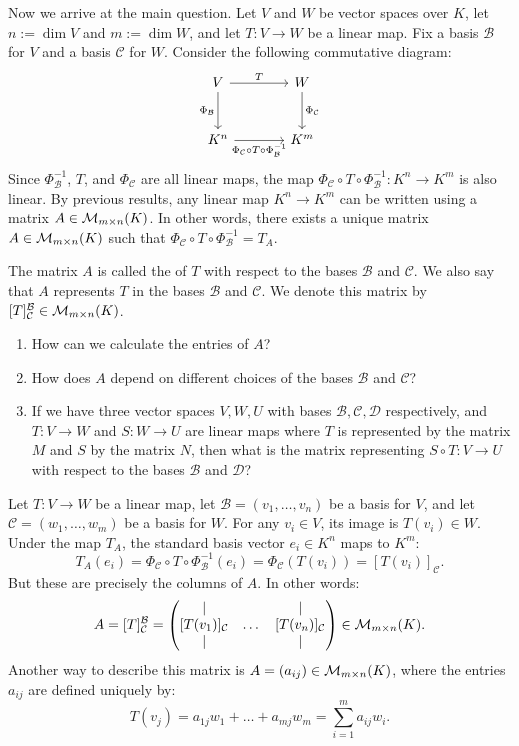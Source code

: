 Now we arrive at the main question. Let $V$ and $W$ be vector spaces over $K$, let $n := \dim V$ and $m := \dim W$, and let $T: V \to W$ be a linear map. Fix a basis $\mathcal{B}$ for $V$ and a basis $\mathcal{C}$ for $W$. Consider the following commutative diagram:
\[
\begin{tikzcd}[row sep=large, column sep=large]
V \arrow[r, "T"] \arrow[d, "\Phi_{\mathcal{B}}"'] & W \arrow[d, "\Phi_{\mathcal{C}}"] \\
K^n \arrow[r, "\Phi_{\mathcal{C}} \circ T \circ \Phi_{\mathcal{B}}^{-1}"'] & K^m
\end{tikzcd}
\]
Since $\Phi_{\mathcal{B}}^{-1}$, $T$, and $\Phi_{\mathcal{C}}$ are all linear maps, the map $\Phi_{\mathcal{C}} \circ T \circ \Phi_{\mathcal{B}}^{-1}: K^n \to K^m$ is also linear. By previous results, any linear map $K^n \to K^m$ can be written using a matrix $A \in \mathcal{M}_{m \times n}(K)$. In other words, there exists a unique matrix $A \in \mathcal{M}_{m \times n}(K)$ such that $\Phi_{\mathcal{C}} \circ T \circ \Phi_{\mathcal{B}}^{-1} = T_A$.

The matrix $A$ is called the  of $T$ with respect to the bases $\mathcal{B}$ and $\mathcal{C}$. We also say that $A$ represents $T$ in the bases $\mathcal{B}$ and $\mathcal{C}$. We denote this matrix by $[T]_{\mathcal{C}}^{\mathcal{B}} \in \mathcal{M}_{m \times n}(K)$.

\begin{question}
\begin{enumerate}
    \item How can we calculate the entries of $A$?
    \item How does $A$ depend on different choices of the bases $\mathcal{B}$ and $\mathcal{C}$?
    \item If we have three vector spaces $V, W, U$ with bases $\mathcal{B}, \mathcal{C}, \mathcal{D}$ respectively, and $T: V \to W$ and $S: W \to U$ are linear maps where $T$ is represented by the matrix $M$ and $S$ by the matrix $N$, then what is the matrix representing $S \circ T: V \to U$ with respect to the bases $\mathcal{B}$ and $\mathcal{D}$?
\end{enumerate}
\end{question}

Let $T: V \to W$ be a linear map, let $\mathcal{B} = (v_1, \dots, v_n)$ be a basis for $V$, and let $\mathcal{C} = (w_1, \dots, w_m)$ be a basis for $W$. For any $v_i \in V$, its image is $T(v_i) \in W$. Under the map $T_A$, the standard basis vector $e_i \in K^n$ maps to $K^m$:
\[
T_A(e_i) = \Phi_{\mathcal{C}} \circ T \circ \Phi_{\mathcal{B}}^{-1}(e_i) = \Phi_{\mathcal{C}}(T(v_i)) = [T(v_i)]_{\mathcal{C}}.
\]
But these are precisely the columns of $A$. In other words:
\[
A = [T]_{\mathcal{C}}^{\mathcal{B}} = 
\begin{pmatrix}
| & & | \\
[T(v_1)]_{\mathcal{C}} & \dots & [T(v_n)]_{\mathcal{C}} \\
| & & |
\end{pmatrix}
\in \mathcal{M}_{m \times n}(K).
\]
Another way to describe this matrix is $A = (a_{ij}) \in \mathcal{M}_{m \times n}(K)$, where the entries $a_{ij}$ are defined uniquely by:
\[
T(v_j) = a_{1j} w_1 + \dots + a_{mj} w_m = \sum_{i=1}^m a_{ij} w_i.
\]


